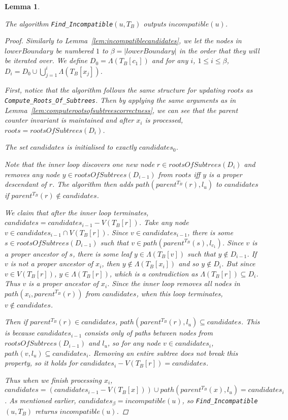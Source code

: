\documentclass{article}
\newcommand{\leafset}{\Lambda}
\newtheorem{findincompatiblecorrectness}[incompatibility]{Lemma}
\begin{document}
    \begin{findincompatiblecorrectness}
        \label{lem:findincompatiblecorrectness}

        The algorithm \texttt{Find\_Incompatible}$(u, T_B)$ outputs $incompatible(u)$.

        \begin{proof}
            Similarly to Lemma~\ref{lem:incompatiblecandidates}, we let the nodes in $lowerBoundary$ be numbered $1$ to $\beta = |lowerBoundary|$ in the order that they will be iterated over. We define $D_0 = \leafset(T_B[c_1])$ and for any $i$, $1 \leq i \leq \beta$, $D_i = D_0 \cup \bigcup_{j = 1}^{i} \leafset(T_B[x_j])$.

            First, notice that the algorithm follows the same structure for updating $roots$ as \texttt{Compute\_Roots\_Of\_Subtrees}. Then by applying the same arguments as in Lemma~\ref{lem:computerootsofsubtreescorrectness}, we can see that the parent counter invariant is maintained and after $x_i$ is processed, $roots = rootsOfSubtrees(D_i)$.

            The set $candidates$ is initialised to exactly $candidates_0$.

            Note that the inner loop discovers one new node $r \in rootsOfSubtrees(D_i)$ and removes any node $y \in rootsOfSubtrees(D_{i-1})$ from $roots$ iff $y$ is a proper descendant of $r$. The algorithm then adds $path(parent^{T_B}(r), l_u)$ to $candidates$ if $parent^{T_B}(r) \not\in candidates$.

            We claim that after the inner loop terminates, $candidates = candidates_{i-1} - V(T_B[r])$. Take any node $v \in candidates_{i-1} \cap V(T_B[r])$. Since $v \in candidates_{i-1}$, there is some $s \in rootsOfSubtrees(D_{i-1})$ such that $v \in path(parent^{T_B}(s), l_{c_1})$. Since $v$ is a proper ancestor of $s$, there is some leaf $y \in \leafset(T_B[v])$ such that $y \not\in D_{i-1}$. If $v$ is not a proper ancestor of $x_i$, then $y \not\in \leafset(T_B[x_i])$ and so $y \not\in D_i$. But since $v \in V(T_B[r])$, $y \in \leafset(T_B[r])$, which is a contradiction as $\leafset(T_B[r]) \subseteq D_i$. Thus $v$ is a proper ancestor of $x_i$. Since the inner loop removes all nodes in $path(x_i, parent^{T_B}(r))$ from $candidates$, when this loop terminates, $v \not\in candidates$.

            Then if $parent^{T_B}(r) \in candidates$, $path(parent^{T_B}(r), l_u) \subseteq candidates$. This is because $candidates_{i-1}$ consists only of paths between nodes from $rootsOfSubtrees(D_{i-1})$ and $l_u$, so for any node $v \in candidates_i$, $path(v, l_u) \subseteq candidates_i$. Removing an entire subtree does not break this property, so it holds for $candidates_i - V(T_B[r]) = candidates$.

            Thus when we finish processing $x_i$, $candidates = (candidates_{i-1} - V(T_B[x])) \cup path(parent^{T_B}(x), l_u) = candidates_i$. As mentioned earlier, $candidates_{\beta} = incompatible(u)$, so \texttt{Find\_Incompatible}$(u, T_B)$ returns $incompatible(u)$.
        \end{proof}
    \end{findincompatiblecorrectness}
\end{document}
